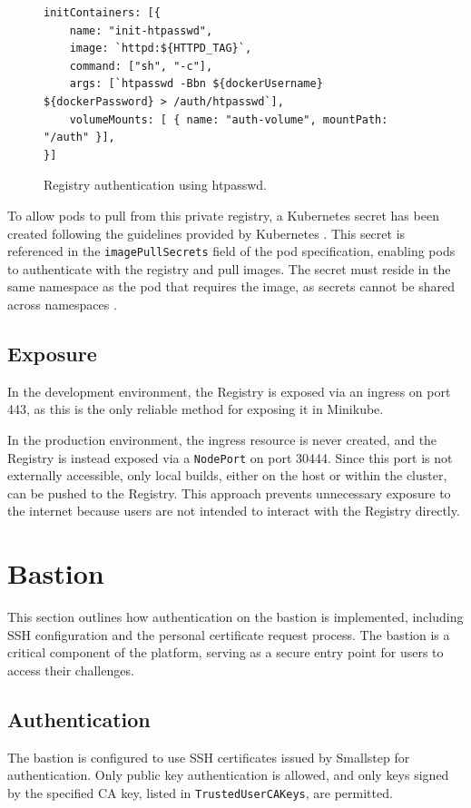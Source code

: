 \begin{figure}[h]
    \centering
\begin{verbatim}
initContainers: [{
    name: "init-htpasswd",
    image: `httpd:${HTTPD_TAG}`,
    command: ["sh", "-c"],
    args: [`htpasswd -Bbn ${dockerUsername} ${dockerPassword} > /auth/htpasswd`],
    volumeMounts: [ { name: "auth-volume", mountPath: "/auth" }],
}]
\end{verbatim}
    \caption{Registry authentication using htpasswd.}
    \label{fig:registry_auth}
\end{figure}

To allow pods to pull from this private registry, a Kubernetes secret has been created following the guidelines provided by Kubernetes \parencite{kubernetes_private_registry}. This secret is referenced in the \texttt{imagePullSecrets} field of the pod specification, enabling pods to authenticate with the registry and pull images. The secret must reside in the same namespace as the pod that requires the image, as secrets cannot be shared across namespaces \parencite{kubernetes_imagepullsecrets}.

\subsection{Exposure}
In the development environment, the Registry is exposed via an ingress on port 443, as this is the only reliable method for exposing it in Minikube.

In the production environment, the ingress resource is never created, and the Registry is instead exposed via a \texttt{NodePort} on port 30444. Since this port is not externally accessible, only local builds, either on the host or within the cluster, can be pushed to the Registry. This approach prevents unnecessary exposure to the internet because users are not intended to interact with the Registry directly.

\section{Bastion}
This section outlines how authentication on the bastion is implemented, including SSH configuration and the personal certificate request process. The bastion is a critical component of the platform, serving as a secure entry point for users to access their challenges.

\subsection{Authentication}
The bastion is configured to use SSH certificates issued by Smallstep for authentication. Only public key authentication is allowed, and only keys signed by the specified CA key, listed in \texttt{TrustedUserCAKeys}, are permitted.

